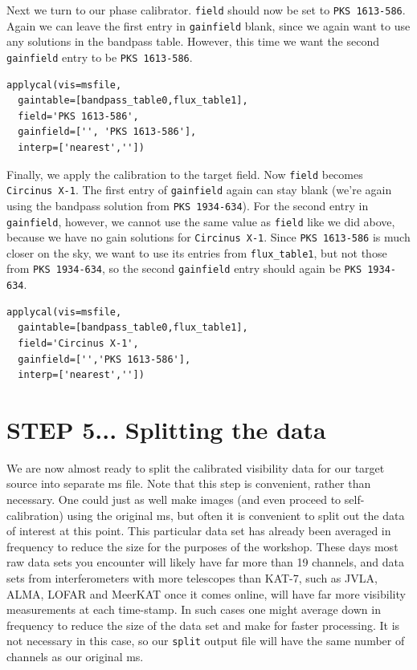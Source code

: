 \documentclass[force,almostfull,justified]{tufte-book}
\begin{document}
Next we turn to our phase calibrator.  {\tt field} should now be set to {\tt PKS 1613-586}.  Again we
can leave the first entry in {\tt gainfield} blank, since we again want to use any solutions in the
bandpass table.  However, this time we want the second {\tt gainfield} entry to be {\tt PKS 1613-586}.

\begin{casacmd}
\begin{verbatim}
applycal(vis=msfile,
  gaintable=[bandpass_table0,flux_table1],
  field='PKS 1613-586',
  gainfield=['', 'PKS 1613-586'], 
  interp=['nearest',''])
\end{verbatim}
\end{casacmd}

Finally, we apply the calibration to the target field.  Now {\tt field} becomes {\tt Circinus X-1}.
The first entry of {\tt gainfield} again can stay blank (we're again using the bandpass solution from
{\tt PKS 1934-634}).  For the second entry in {\tt gainfield}, however, we cannot use the same value
as {\tt field} like we did above, because we have no gain solutions for {\tt Circinus X-1}.  Since
{\tt PKS 1613-586} is much closer on the sky, we want to use its entries from {\tt flux\_table1}, but
not those from {\tt PKS 1934-634}, so the second {\tt gainfield} entry should again be {\tt PKS
1934-634}.

\begin{casacmd}
\begin{verbatim}
applycal(vis=msfile,
  gaintable=[bandpass_table0,flux_table1],
  field='Circinus X-1',
  gainfield=['','PKS 1613-586'],
  interp=['nearest',''])
\end{verbatim}
\end{casacmd}


\section{STEP 5... Splitting the data}

We are now almost ready to split the calibrated visibility data for our target source into separate ms
file.  Note that this step is convenient, rather than necessary.  One could just as well make images
(and even proceed to self-calibration) using the original ms, but often it is convenient to split out
the data of interest at this point.  This particular data set has already been averaged in frequency
to reduce the size for the purposes of the workshop.  These days most raw data sets you encounter will
likely have far more than 19 channels, and data sets from interferometers with more telescopes than
KAT-7, such as JVLA, ALMA, LOFAR and MeerKAT once it comes online, will have far more visibility
measurements at each time-stamp.  In such cases one might average down in frequency to reduce the size
of the data set and make for faster processing.  It is not necessary in this case, so our {\tt split}
output file will have the same number of channels as our original ms.
\end{document}
